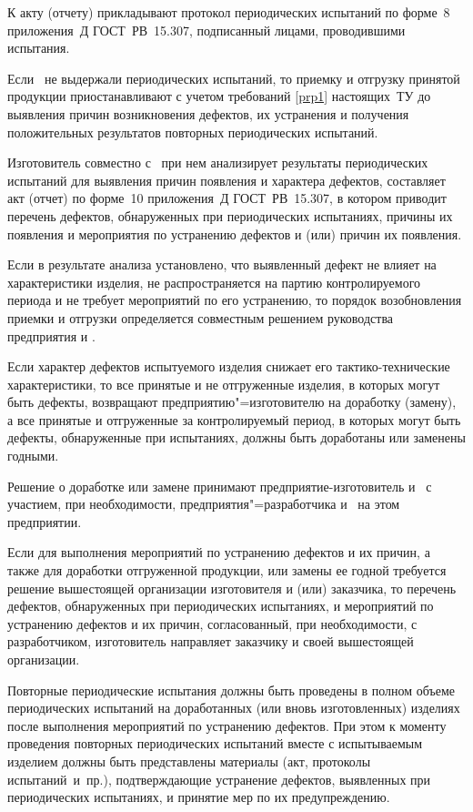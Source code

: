 К акту (отчету) прикладывают протокол периодических испытаний по форме~8 приложения~Д ГОСТ~РВ~15.307, подписанный лицами, проводившими испытания.

\point  
\label{prx1}
Если \dut \  не выдержали периодических испытаний, то приемку и отгрузку принятой продукции приостанавливают с учетом требований \ref{prp1} настоящих~ТУ до выявления причин возникновения дефектов, их устранения и получения положительных результатов повторных периодических испытаний.

Изготовитель совместно с \client \ при нем анализирует результаты периодических испытаний для выявления причин появления и характера дефектов, составляет акт (отчет) по форме~10 приложения~Д ГОСТ~РВ~15.307, в котором приводит перечень дефектов, обнаруженных при периодических испытаниях, причины их появления и мероприятия по устранению дефектов и (или) причин их появления.

Если в результате анализа установлено, что выявленный дефект не влияет на характеристики изделия, не распространяется на партию контролируемого периода и не требует мероприятий по его устранению, то порядок возобновления приемки и отгрузки определяется совместным решением руководства предприятия и \client.

\point   
Если характер дефектов испытуемого изделия снижает его тактико-технические характеристики, то все принятые и не отгруженные изделия, в которых могут быть дефекты, возвращают предприятию"=изготовителю на доработку (замену), а все принятые и отгруженные за контролируемый период, в которых могут быть дефекты, обнаруженные при испытаниях, должны быть доработаны или заменены годными.

Решение о доработке или замене принимают предприятие-изготовитель и \client \ с участием, при необходимости, предприятия"=разработчика и \client \ на этом предприятии.

\point 
Если для выполнения мероприятий по устранению дефектов и их причин, а также для доработки отгруженной продукции, или замены ее годной требуется решение вышестоящей организации изготовителя и (или) заказчика, то перечень дефектов, обнаруженных при периодических испытаниях, и мероприятий по устранению дефектов и их причин, согласованный, при необходимости, с разработчиком, изготовитель направляет заказчику и своей вышестоящей организации.

\point 
Повторные периодические испытания должны быть проведены в полном объеме периодических испытаний на доработанных (или вновь изготовленных) изделиях после выполнения мероприятий по устранению дефектов. При этом к моменту проведения повторных периодических испытаний вместе с испытываемым изделием должны быть представлены материалы (акт, протоколы испытаний~и~пр.), подтверждающие устранение дефектов, выявленных при периодических испытаниях, и принятие мер по их предупреждению.

